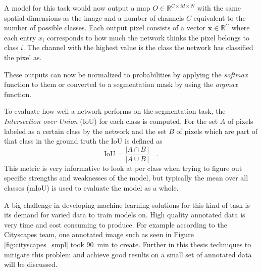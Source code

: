 A model for this task would now output a map $O\in\mathbb{R}^{C\times M\times N}$ with the same spatial dimensions as the image and a number of channels $C$ equivalent to the number of possible classes. Each output pixel consists of a vector $\mathbf{x}\in \mathbb{R}^C$ where each entry $x_i$ corresponds to how much the network thinks the pixel belongs to class $i$. The channel with the highest value is the class the network has classified the pixel as.

These outputs can now be normalized to probabilities by applying the \emph{softmax} function to them or converted to a segmentation mask by using the \emph{argmax} function.

To evaluate how well a network performs on the segmentation task, the \emph{Intersection over Union} (IoU) for each class is computed. For the set $A$ of pixels labeled as a certain class by the network and the set $B$ of pixels which are part of that class in the ground truth the IoU is defined as
$$
    \text{IoU} = \frac{\left|A\cap B \,\right|}{\left|A\cup B \,\right|}\quad .
$$
This metric is very informative to look at per class when trying to figure out specific strengths and weaknesses of the model, but typically the mean over all classes (mIoU) is used to evaluate the model as a whole.

A big challenge in developing machine learning solutions for this kind of task is its demand for varied data to train models on. High quality annotated data is very time and cost consuming to produce. 
For example according to the Cityscapes team, one annotated image such as seen in Figure \ref{fig:cityscapes_smpl} took \SI{90}{min} to create. 
Further in this thesis techniques to mitigate this problem and achieve good results on a small set of annotated data will be discussed.
